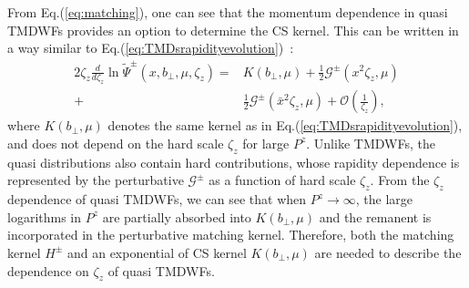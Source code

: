\documentclass[prd,aps,twocolumn,preprintnumbers, showpacs, nofootinbib,superscriptaddress,notitlepage]{revtex4-1}
\newcommand\bl{\color{blue}}
\begin{document}
From Eq.(\ref{eq:matching}), one can see that the momentum dependence in   quasi TMDWFs {\bl provides} an option to determine the CS kernel. This can be written  in a way similar {\bl to} Eq.(\ref{eq:TMDsrapidityevolution})~\cite{Ji:2021znw}: 
\begin{align}
	2 \zeta_z \frac{d}{d \zeta_z} \ln \tilde \Psi^{\pm}\left(x, b_{\perp}, \mu, \zeta_z\right)=&K\left(b_{\perp}, \mu\right) +\frac{1}{2}\mathcal{G}^{\pm}\left(x^2\zeta_z,\mu\right) \nonumber\\
	+& \frac{1}{2}\mathcal{G}^{\pm}\left(\bar{x}^2\zeta_z,\mu\right)+\mathcal{O}\left(\frac{1}{\zeta_z}\right), \label{eq:quasiTMDsrapidityevolution}
\end{align}
where $K\left(b_{\perp}, \mu\right)$ denotes the same kernel as in Eq.(\ref{eq:TMDsrapidityevolution}), and {\bl does not depend} on the hard scale $\zeta_z$ for large $P^z$. Unlike TMDWFs, the  quasi distributions also contain hard contributions, whose  rapidity dependence is  represented by the perturbative  $\mathcal{G}^{\pm}$ as a function of hard scale $\zeta_z$. 
{\bl From the $\zeta_z$ dependence} of quasi TMDWFs, we can see that when $P^z\to\infty$, the large logarithms in $P^z$ are partially absorbed {\bl into} $K\left(b_{\perp}, \mu\right)$  and the remanent is incorporated in the perturbative matching kernel. Therefore,  both the matching kernel $H^{\pm}$  and an exponential of  CS kernel $K\left(b_{\perp}, \mu\right)$ are needed to describe the dependence on $\zeta_z$ of quasi TMDWFs. 
\end{document}
